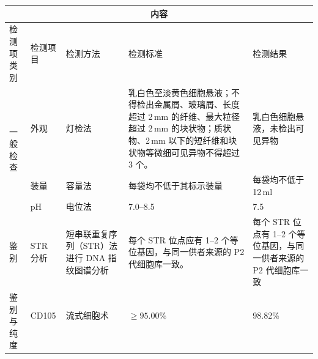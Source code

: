 \documentclass[UTF8,10pt,a4paper,fontset=fandol]{ctexart}
\newcommand{\fieldvalue}[1]{#1}
\begin{document}
\medskip

\begin{center}
\begin{tabular}{|p{1.45cm}|p{2.05cm}|p{3.45cm}|p{4.35cm}|p{4.25cm}|}
\hline
\multicolumn{5}{|c|}{内\quad 容} \\ \hline
检测项类别 & 检测项目 & 检测方法 & 检测标准 & 检测结果 \\ \hline

\multirow{3}{*}{一般检查}
&
\fieldvalue{外观}
&
\fieldvalue{灯检法}
&
\fieldvalue{乳白色至淡黄色细胞悬液；不得检出金属屑、玻璃屑、长度超过 2\,mm 的纤维、最大粒径超过 2\,mm 的块状物；质状物、2\,mm 以下的短纤维和块状物等微细可见异物不得超过 3 个。}
&
\fieldvalue{乳白色细胞悬液，未检出可见异物}
\\ \cline{2-5}

&
\fieldvalue{装量}
&
\fieldvalue{容量法}
&
\fieldvalue{每袋均不低于其标示装量}
&
\fieldvalue{每袋均不低于 12\,ml}
\\ \cline{2-5}

&
\fieldvalue{pH}
&
\fieldvalue{电位法}
&
\fieldvalue{7.0--8.5}
&
\fieldvalue{7.5}
\\ \hline

鉴别
&
\fieldvalue{STR 分析}
&
\fieldvalue{短串联重复序列（STR）法进行 DNA 指纹图谱分析}
&
\fieldvalue{每个 STR 位点应有 1--2 个等位基因，与同一供者来源的 P2 代细胞库一致。}
&
\fieldvalue{每个 STR 位点有 1--2 个等位基因，与同一供者来源的 P2 代细胞库一致}
\\ \hline

\multirow{7}{*}{鉴别与纯度}
&
\fieldvalue{CD105}
&
\fieldvalue{流式细胞术}
&
\fieldvalue{$\geq 95.00\%$}
&
\fieldvalue{98.82\%}
\\ \cline{2-5}


\end{tabular}
\end{center}
\end{document}
